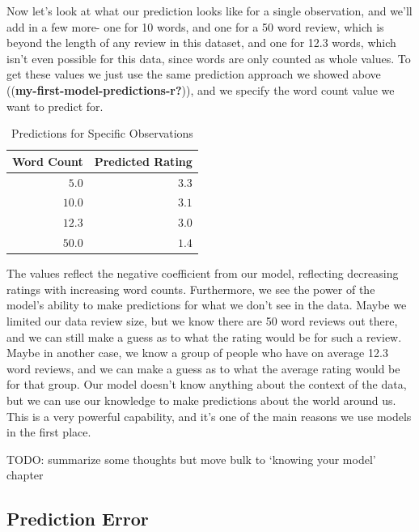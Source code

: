 \documentclass[
  letterpaper,
]{krantz}
\begin{document}
Now let's look at what our prediction looks like for a single
observation, and we'll add in a few more- one for 10 words, and one for
a 50 word review, which is beyond the length of any review in this
dataset, and one for 12.3 words, which isn't even possible for this
data, since words are only counted as whole values. To get these values
we just use the same prediction approach we showed above
((\textbf{my-first-model-predictions-r?})), and we specify the word
count value we want to predict for.

\begin{longtable}{rr}

\caption{\label{tbl-predictions}Predictions for Specific Observations}

\tabularnewline

\toprule
Word Count & Predicted Rating \\ 
\midrule\addlinespace[2.5pt]
\textcolor[HTML]{404040}{$5.0$} & \textcolor[HTML]{404040}{$3.3$} \\ 
\textcolor[HTML]{404040}{$10.0$} & \textcolor[HTML]{404040}{$3.1$} \\ 
\textcolor[HTML]{404040}{$12.3$} & \textcolor[HTML]{404040}{$3.0$} \\ 
\textcolor[HTML]{404040}{$50.0$} & \textcolor[HTML]{404040}{$1.4$} \\ 
\bottomrule

\end{longtable}

The values reflect the negative coefficient from our model, reflecting
decreasing ratings with increasing word counts. Furthermore, we see the
power of the model's ability to make predictions for what we don't see
in the data. Maybe we limited our data review size, but we know there
are 50 word reviews out there, and we can still make a guess as to what
the rating would be for such a review. Maybe in another case, we know a
group of people who have on average 12.3 word reviews, and we can make a
guess as to what the average rating would be for that group. Our model
doesn't know anything about the context of the data, but we can use our
knowledge to make predictions about the world around us. This is a very
powerful capability, and it's one of the main reasons we use models in
the first place.

TODO: summarize some thoughts but move bulk to `knowing your model'
chapter

\subsection{Prediction Error}\label{sec-lm-prediction-error}
\end{document}
